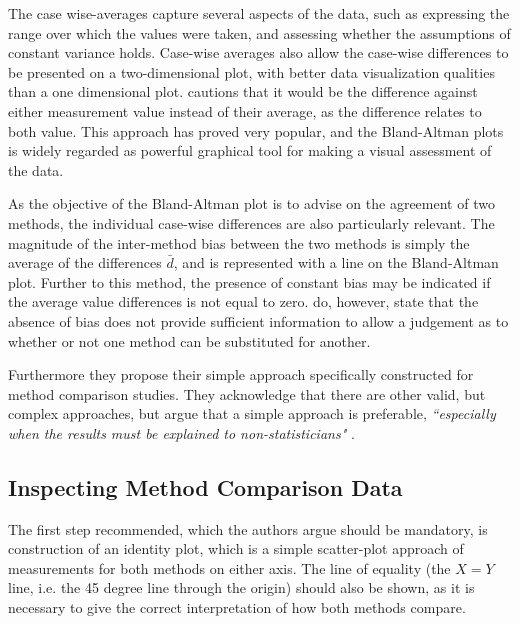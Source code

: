 \documentclass[12pt, a4paper]{report}
\theoremstyle{plain}
\theoremstyle{definition}
\theoremstyle{remark}
\begin{document}
%
%	
The case wise-averages capture several aspects of the data, such as expressing the range over which the values were taken, and assessing whether the assumptions of constant variance holds. Case-wise averages also allow the case-wise differences to be presented on a two-dimensional plot, with better data visualization qualities than a one dimensional plot. \citet{BA86}
	cautions that it would be the difference against either measurement value instead of their average, as the difference relates to both value. This approach has proved very popular, and the Bland-Altman plots is widely regarded as powerful graphical tool for making a visual assessment of the data.
	
As the objective of the Bland-Altman plot is to advise on the agreement of two methods, the individual case-wise differences are also particularly relevant. The magnitude of the inter-method bias between the two methods is simply the average of the differences $\bar{d}$, and is represented with a line on the Bland-Altman plot. Further to this method, the presence of constant bias may be indicated if the average value differences is not equal to zero. \citet{BA86} do, however, state that the absence of bias does not provide sufficient information to allow a judgement as to whether or not one method can be substituted for	another.
	
Furthermore they propose their simple approach specifically constructed for method comparison studies. They acknowledge that there are other valid, but complex approaches, but argue that
		a simple approach is preferable,
		\textit{``especially when the results must be explained to
			non-statisticians"} \citep*{BA83}.
		
	\subsection{Inspecting Method Comparison Data}
The first step recommended, which the authors argue should be mandatory, is construction of an identity plot, which is a simple scatter-plot approach of measurements for both methods on either axis. The line of equality (the $X=Y$ line, i.e. the 45 degree line through the origin) should also be shown, as it is necessary to give the correct interpretation of how both methods compare. 
\end{document}
